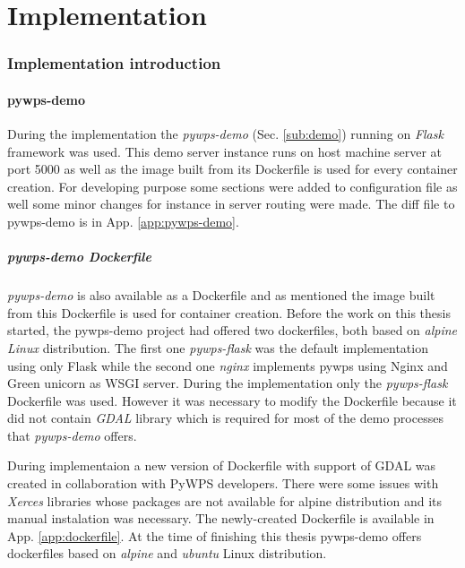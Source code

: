\newpage
\part{Implementation}

\newpage
\section{Implementation introduction}

\subsection{pywps-demo}
During the implementation the \textit{pywps-demo}
(Sec. \ref{sub:demo}) running on \textit{Flask} framework was
used. This demo server instance runs on host machine server at port
5000 as well as the image built from its Dockerfile is used for every
container creation. For developing purpose some sections were added to
configuration file as well some minor changes for instance in server
routing were made. The diff file to pywps-demo is in
App. \ref{app:pywps-demo}.

\subsubsection{pywps-demo Dockerfile}
\textit{pywps-demo} is also available as a Dockerfile and as mentioned
the image built from this Dockerfile is used for container creation.
Before the work on this thesis started, the pywps-demo project had
offered two dockerfiles, both based on \textit{alpine Linux}
distribution. The first one \textit{pywps-flask} was the default
implementation using only Flask while the second one \textit{nginx}
implements pywps using Nginx and Green unicorn as WSGI server. During
the implementation only the \textit{pywps-flask} Dockerfile was
used. However it was necessary to modify the Dockerfile because it did
not contain \textit{GDAL} library which is required for most of the
demo processes that \textit{pywps-demo} offers.

During implementaion a new version of Dockerfile with
support of GDAL was created in collaboration with PyWPS
developers. There were some issues with \textit{Xerces} libraries
whose packages are not available for alpine distribution and its
manual instalation was necessary. The newly-created Dockerfile is
available in App. \ref{app:dockerfile}. At the time of finishing this
thesis pywps-demo offers dockerfiles based on \textit{alpine} and
\textit{ubuntu} Linux distribution.


